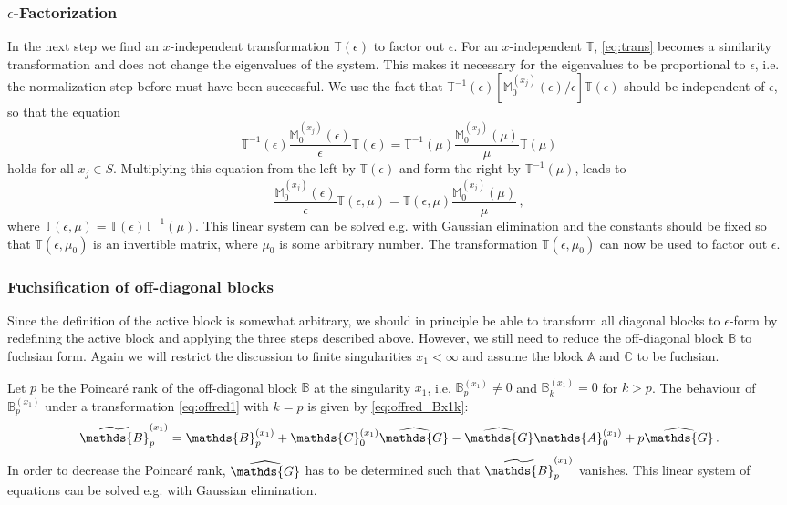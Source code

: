 \documentclass[12pt]{article}
\numberwithin{equation}{section}
\numberwithin{figure}{section}
\newcommand{\M}{\mathds{M}}
\newcommand{\A}{\mathds{A}}
\newcommand{\B}{\mathds{B}}
\newcommand{\C}{\mathds{C}}
\newcommand{\G}{\mathds{G}}
\newcommand{\T}{\mathds{T}}
\begin{document}
      \subsubsection*{$\epsilon$-Factorization}
				In the next step we find an $x$-independent transformation $\T(\epsilon)$ to factor out $\epsilon$.
        For an $x$-independent $\T$, \eqref{eq:trans} becomes a similarity transformation and does not change the eigenvalues of the system.
				This makes it necessary for the eigenvalues to be proportional to $\epsilon$, i.e. the normalization step before must have been successful.
        We use the fact that $\T^{-1}(\epsilon) [\M^{(x_j)}_0(\epsilon)/\epsilon] \T(\epsilon)$ should be independent of $\epsilon$, so that the equation 
        \[
          \T^{-1}(\epsilon) \frac{\M^{(x_j)}_0(\epsilon)}\epsilon \T(\epsilon)
          =
          \T^{-1}(\mu) \frac{\M^{(x_j)}_0(\mu)}\mu \T(\mu)
        \]
        holds for all $x_j \in S$.
        Multiplying this equation from the left by $\T(\epsilon)$ and form the right by $\T^{-1}(\mu)$, leads to
        \begin{equation} \label{eq:epfact}
          \frac{\M^{(x_j)}_0(\epsilon)}\epsilon \T(\epsilon,\mu)
          =
          \T(\epsilon,\mu) \frac{\M^{(x_j)}_0(\mu)}\mu\,,
        \end{equation}
        where $\T(\epsilon,\mu) = \T(\epsilon)\T^{-1}(\mu)$.
        This linear system can be solved e.g. with Gaussian elimination and the constants should be fixed so that $\T(\epsilon,\mu_0)$ is an invertible matrix, where $\mu_0$ is some arbitrary number.
        The transformation $\T(\epsilon,\mu_0)$ can now be used to factor out $\epsilon$.

      \subsubsection*{Fuchsification of off-diagonal blocks}
				Since the definition of the active block is somewhat arbitrary, we should in principle be able to transform all diagonal blocks to $\epsilon$-form by redefining the active block and applying the three steps described above.
				However, we still need to reduce the off-diagonal block $\B$ to fuchsian form.
        Again we will restrict the discussion to finite singularities $x_1<\infty$ and assume the block $\A$ and $\C$ to be fuchsian.
       
        Let $p$ be the Poincar\'{e} rank of the off-diagonal block $\B$ at the singularity $x_1$, i.e. $\B^{(x_1)}_p \neq 0$ and $\B^{(x_1)}_k = 0$ for $k>p$.
        The behaviour of $\B^{(x_1)}_p$ under a transformation \eqref{eq:offred1} with $k=p$ is given by \eqref{eq:offred_Bx1k}:
        \[
          \widetilde\B^{(x_1)}_p = 
            \B^{(x_1)}_p
            + \C_0^{(x_1)}\widehat\G - \widehat\G\A_0^{(x_1)} 
            + p\widehat\G\,.
        \]
        In order to decrease the Poincar\'{e} rank, $\widehat\G$ has to be determined such that $\widetilde\B^{(x_1)}_p$ vanishes.
        This linear system of equations can be solved e.g. with Gaussian elimination.
       
\end{document}
